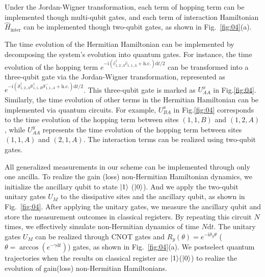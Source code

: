 \documentclass[longbibliography, aps, prx, amsmath, amssymb, amsfonts, twocolumn,superscriptaddress, footinbib]{revtex4-1}
\begin{document}
	Under the Jordan-Wigner transformation, each term of hopping term can be implemented though multi-qubit gates, and each term of interaction Hamiltonian $\hat{H}_{\text{inter}}$ can be implemented though two-qubit gates, as shown in Fig.~\ref{fig:04}(a). 

	The time evolution of the Hermitian Hamiltonian can be implemented by decomposing the system's evolution into quantum gates. For instance, the time evolution of the hopping term $e^{-\mathrm{i} (\hat{c}_{1,2,A}^{\dagger} \hat{c}_{1,1,A} + \text{h.c.})\mathrm{d} t/2}$ can be transformed into a three-qubit gate via the Jordan-Wigner transformation, represented as $e^{-\mathrm{i} (\hat{\sigma}_{1,2,A}^{\dagger} \hat{\sigma}^z_{1,1,B}\hat{\sigma}_{1,1,A}^{-} + \text{h.c.})\mathrm{d} t/2}$. This three-qubit gate is marked as $U_{AA}^x$ in Fig.\ref{fig:04}. Similarly, the time evolution of other terms in the Hermitian Hamiltonian can be implemented via quantum circuits. For example, $U_{BA}^x$ in Fig.\ref{fig:04} corresponds to the time evolution of the hopping term between sites $(1,1,B)$ and $(1,2,A)$, while $U_{AA}^y$ represents the time evolution of the hopping term between sites $(1,1,A)$ and $(2,1,A)$. The interaction terms can be realized using two-qubit gates.

	All generalized measurements in our scheme can be implemented through only one ancilla. To realize the gain (loss) non-Hermitian Hamiltonian dynamics, we initialize the ancillary qubit to state $\ket{1}$ ($\ket{0}$). And we apply the two-qubit unitary gates $U_M$ to the dissipative sites and the ancillary qubit, as shown in Fig.~\ref{fig:04}. After applying the unitary gates, we measure the ancillary qubit and store the measurement outcomes in classical registers. 
	By repeating this circuit $N$ times, we effectively simulate non-Hermitian dynamics of time $N\mathrm{d}t$.
	The unitary gates $U_M$ can be realized through CNOT gates and $R_y(\theta) = e^{-\mathrm{i} \hat{\sigma}_y \theta}$ ($\theta = \arccos(e^{-\gamma \mathrm{d}t})$) gates, as shown in Fig.~\ref{fig:04}(a). 
	We postselect quantum trajectories when the results on classical register are $\ket{1}$($\ket{0}$) to realize the evolution of gain(loss) non-Hermitian Hamiltonians.
\end{document}
